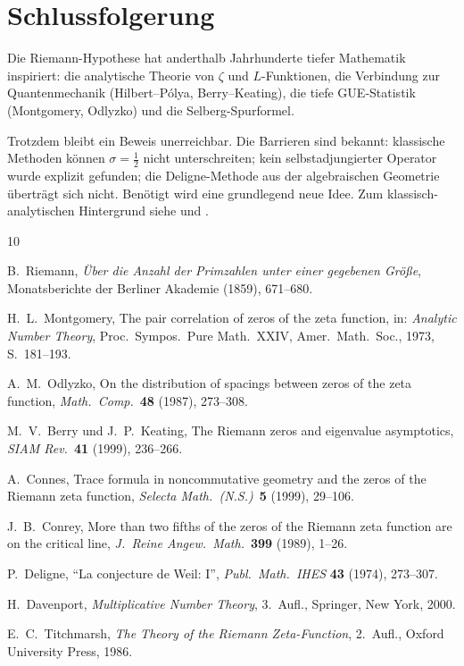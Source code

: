 \documentclass[12pt,a4paper]{amsart}
\theoremstyle{definition}
\begin{document}
\section{Schlussfolgerung}

Die Riemann-Hypothese hat anderthalb Jahrhunderte tiefer Mathematik
inspiriert: die analytische Theorie von $\zeta$ und $L$-Funktionen,
die Verbindung zur Quantenmechanik (Hilbert--P\'olya, Berry--Keating),
die tiefe GUE-Statistik (Montgomery, Odlyzko) und die Selberg-Spurformel.

Trotzdem bleibt ein Beweis unerreichbar. Die Barrieren sind bekannt:
klassische Methoden k\"onnen $\sigma = \tfrac{1}{2}$ nicht unterschreiten;
kein selbstadjungierter Operator wurde explizit gefunden;
die Deligne-Methode aus der algebraischen Geometrie \"ubertr\"agt sich nicht.
Ben\"otigt wird eine grundlegend neue Idee.
Zum klassisch-analytischen Hintergrund siehe \cite{Davenport2000} und \cite{Titchmarsh1986}.

\begin{thebibliography}{10}

B.~Riemann,
\emph{\"Uber die Anzahl der Primzahlen unter einer gegebenen Gr\"o\ss e},
Monatsberichte der Berliner Akademie (1859), 671--680.

H.~L.~Montgomery,
The pair correlation of zeros of the zeta function,
in: \emph{Analytic Number Theory}, Proc.\ Sympos.\ Pure Math.~XXIV,
Amer.\ Math.\ Soc., 1973, S.~181--193.

A.~M.~Odlyzko,
On the distribution of spacings between zeros of the zeta function,
\emph{Math.\ Comp.}\ \textbf{48} (1987), 273--308.

M.~V.~Berry und J.~P.~Keating,
The Riemann zeros and eigenvalue asymptotics,
\emph{SIAM Rev.}\ \textbf{41} (1999), 236--266.

A.~Connes,
Trace formula in noncommutative geometry and the zeros of the Riemann
zeta function,
\emph{Selecta Math.\ (N.S.)}\ \textbf{5} (1999), 29--106.

J.~B.~Conrey,
More than two fifths of the zeros of the Riemann zeta function are on
the critical line,
\emph{J.\ Reine Angew.\ Math.}\ \textbf{399} (1989), 1--26.

P.~Deligne, ``La conjecture de Weil: I'', \textit{Publ.\ Math.\ IHES} \textbf{43} (1974), 273--307.

H.~Davenport,
\emph{Multiplicative Number Theory}, 3.~Aufl.,
Springer, New York, 2000.

E.~C.~Titchmarsh,
\emph{The Theory of the Riemann Zeta-Function}, 2.~Aufl.,
Oxford University Press, 1986.

\end{thebibliography}
\end{document}
